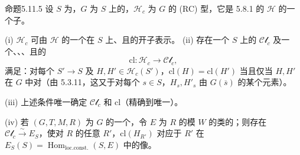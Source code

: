 \begin{SGAresult}{命题}{5.11.5}
设 $S$ 为，$G$ 为 $S$ 上的，$\mathcal H_c$ 为 $G$ 的 (RC) 型，它是 5.8.1 的 $\mathcal H$ 的一个子。

(i) $\mathcal H_c$ 可由 $\mathcal H$ 的一个在 $S$ 上、且的开子表示。
(ii) 存在一个 $S$ 上的 $\mathcal{Cl}_c$ 及一个、、、且的
\[\mathrm{cl}:\mathcal H_c\longrightarrow\mathcal{Cl}_c,\]
满足：对每个 $S'\to S$ 及 $H,H'\in\mathcal H_c(S')$，$\mathrm{cl}(H)=\mathrm{cl}(H')$ 当且仅当 $H,H'$ 在 $G$ 中对（由 5.3.11，这又于对每个 $s\in S$，$H_s,H'_s$ 由 $G(\overline s)$ 的某个元素）。

(iii) 上述条件唯一确定 $\mathcal{Cl}_c$ 和 $\mathrm{cl}$（精确到唯一）。

(iv) 若 $(G,T,M,R)$ 为 $G$ 的一个，令 $E$ 为 $R$ 的模 $W$ 的类的；则存在 $\mathcal{Cl}_c\xrightarrow\sim E_S$，使对 $R$ 的任意 $R'$，$\mathrm{cl}(H_{R'})$ 对应于 $R'$ 在 $E_S(S)=\operatorname{Hom}_{\mathrm{loc.const.}}(S,E)$ 中的像。
\end{SGAresult}
